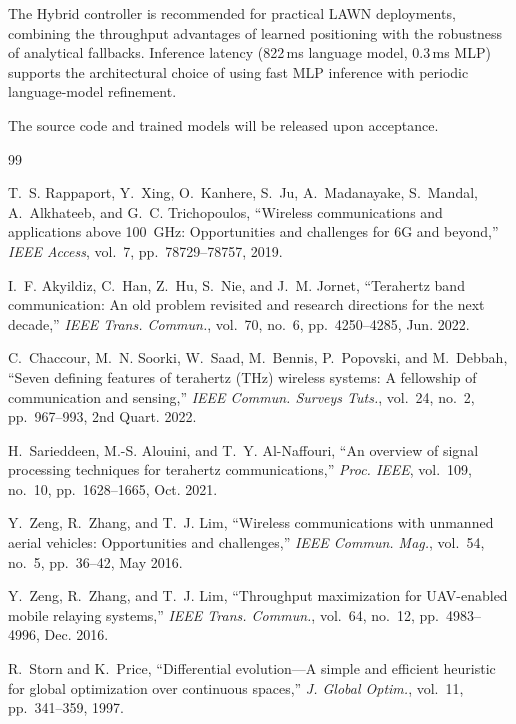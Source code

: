 \documentclass[journal]{IEEEtran}
\begin{document}
The Hybrid controller is recommended for practical LAWN deployments, combining the throughput advantages of learned positioning with the robustness of analytical fallbacks. Inference latency (822\,ms language model, 0.3\,ms MLP) supports the architectural choice of using fast MLP inference with periodic language-model refinement.

The source code and trained models will be released upon acceptance.


\balance


\begin{thebibliography}{99}

T.~S. Rappaport, Y.~Xing, O.~Kanhere, S.~Ju, A.~Madanayake, S.~Mandal, A.~Alkhateeb, and G.~C. Trichopoulos, ``Wireless communications and applications above 100~GHz: Opportunities and challenges for 6G and beyond,'' \textit{IEEE Access}, vol.~7, pp.~78729--78757, 2019.

I.~F. Akyildiz, C.~Han, Z.~Hu, S.~Nie, and J.~M. Jornet, ``Terahertz band communication: An old problem revisited and research directions for the next decade,'' \textit{IEEE Trans. Commun.}, vol.~70, no.~6, pp.~4250--4285, Jun. 2022.

C.~Chaccour, M.~N. Soorki, W.~Saad, M.~Bennis, P.~Popovski, and M.~Debbah, ``Seven defining features of terahertz (THz) wireless systems: A fellowship of communication and sensing,'' \textit{IEEE Commun. Surveys Tuts.}, vol.~24, no.~2, pp.~967--993, 2nd Quart. 2022.

H.~Sarieddeen, M.-S. Alouini, and T.~Y. Al-Naffouri, ``An overview of signal processing techniques for terahertz communications,'' \textit{Proc. IEEE}, vol.~109, no.~10, pp.~1628--1665, Oct. 2021.

Y.~Zeng, R.~Zhang, and T.~J. Lim, ``Wireless communications with unmanned aerial vehicles: Opportunities and challenges,'' \textit{IEEE Commun. Mag.}, vol.~54, no.~5, pp.~36--42, May 2016.

Y.~Zeng, R.~Zhang, and T.~J. Lim, ``Throughput maximization for UAV-enabled mobile relaying systems,'' \textit{IEEE Trans. Commun.}, vol.~64, no.~12, pp.~4983--4996, Dec. 2016.

R.~Storn and K.~Price, ``Differential evolution---A simple and efficient heuristic for global optimization over continuous spaces,'' \textit{J. Global Optim.}, vol.~11, pp.~341--359, 1997.


\end{thebibliography}
\end{document}
